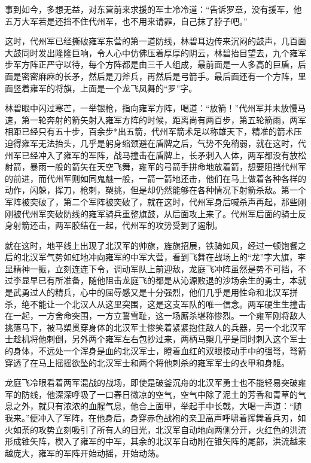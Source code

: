 事到如今，多想无益，对东营前来求援的军士冷冷道：“告诉罗章，没有援军，他五万大军若是还挡不住代州军，也不用来请罪，自己抹了脖子吧。”

这时，代州军已经撕破雍军东营的第一道防线，林碧耳边传来沉闷的鼓声，几百面大鼓同时发出隆隆巨响，令人心中仿佛压着厚厚的阴云，林碧抬目望去，九个雍军步军方阵正严守以待，每个方阵都是由三千人组成，最前面是一人多高的巨盾，后面是密密麻麻的长矛，然后是刀斧兵，再然后是弓箭手。最后面还有一个方阵，里面竖着雍军的将旗，上面是一个龙飞凤舞的“罗”字。

林碧眼中闪过寒芒，一举银枪，指向雍军方阵，喝道：“放箭！”代州军并未放慢马速，第一轮奔射的箭矢射入雍军方阵的时候，距离尚有两百步，第五轮箭雨，两军相距已经只有五十步，百余步*出五箭，代州军箭术足以称雄天下，精准的箭术压迫得雍军无法抬头，几乎是躬身缩颈避在盾牌之后，气势不免稍弱，就在这时，代州军已经冲入了雍军的军阵，战马撞击在盾牌上，长矛刺入人体，两军都没有放松射箭，暴雨一般的箭矢在天空飞舞，雍军的弓箭手拼命地放着箭，想要阻挡代州军的前进，而代州军则如同鬼魅一般，一箭一箭地还击，他们在马上做着各种各样的动作，闪躲，挥刀，枪刺，槊挑，但是却仍然能够在各种情况下射箭杀敌。第一个军阵被突破了，第二个军阵被突破了，就在这时，代州军身后喊杀声再起，那些刚刚被代州军突破防线的雍军骑兵重整旗鼓，从后面攻上来了。代州军后面的骑士反身射箭还击，两军胶结在一起，代州军的攻势受到了遏制。

就在这时，地平线上出现了北汉军的帅旗，旌旗招展，铁骑如风，经过一顿饱餐之后的北汉军气势如虹地冲向雍军的中军大营，看到飞舞在战场上的“龙”字大旗，李显精神一振，立刻连连下令，调动军队上前迎敌，龙庭飞冲阵虽然是势不可挡，不过李显早已有所准备，随他阻击龙庭飞的都是从沁源败退的沙场余生的勇士，本就是武勇过人的精兵，心中的屈辱感又是十分强烈，他们几乎是用性命和北汉军拼杀，绝不能让一个北汉人从这里突围，这是这支军队的唯一信念。两军硬生生撞击在一起，一方舍命突围，一方立誓雪耻，这一场厮杀堪称惨烈。一个雍军刚将敌人挑落马下，被马槊贯穿身体的北汉军士惨笑着紧紧抱住敌人的兵器，另一个北汉军士趁机将他刺倒，另外两个雍军左右包抄过来，两柄马槊几乎是同时刺入这个军士的身体，不远处一个浑身是血的北汉军士，瞪着血红的双眼按动手中的强弩，弩箭穿透了在马上摇摇欲坠的北汉军士和两个将他刺杀的雍军军士的衣甲和身躯。

龙庭飞冷眼看着两军混战的战场，即使是破釜沉舟的北汉军勇士也不能轻易突破雍军的防线，他深深呼吸了一口春日微凉的空气，空气中除了泥土的芳香和青草的气息之外，就只有浓浓的血腥气息，他合上面甲，举起手中长戟，大喝一声道：“随我来。”便冲入了军阵，在他身后，身穿赤色战袍的亲卫高声呼啸着挥舞着兵刃，如火如荼的攻势立刻吸引了所有人的目光，北汉军自动地向两侧分开，火红色的洪流形成锥矢阵，楔入了雍军的中军，其余的北汉军自动附在锥矢阵的尾部，洪流越来越庞大，雍军的军阵开始动摇，开始动荡。

